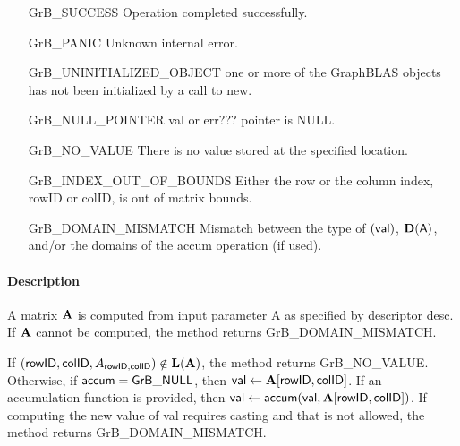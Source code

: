 \begin{itemize}[leftmargin=2.1in]
\item[{\sf GrB\_SUCCESS}]             Operation completed successfully.
\item[{\sf GrB\_PANIC}]               Unknown internal error.
\item[{\sf GrB\_UNINITIALIZED\_OBJECT}]   one or more of the GraphBLAS objects has
                             not been initialized by a call to {\sf new}.
\item[{\sf GrB\_NULL\_POINTER}]    {\sf val} or {\sf err???} pointer is {\sf NULL}.
\item[{\sf GrB\_NO\_VALUE}]             There is no value stored at the specified location.
\item[{\sf GrB\_INDEX\_OUT\_OF\_BOUNDS}]  Either the row or the column index,
                                      {\sf rowID} or {\sf colID}, is out of matrix bounds.
\item[{\sf GrB\_DOMAIN\_MISMATCH}]    Mismatch between the type of $(\sf val)$, 
                                      $\bold{D}({\sf A})$, and/or the domains of the 
                                      {\sf accum} operation (if used).
\end{itemize}

\paragraph{Description}

A matrix ${\bf A}$ is computed from input parameter {\sf A} as specified by descriptor {\sf desc}.
If ${\bf A}$ cannot be computed, the method returns {\sf GrB\_DOMAIN\_MISMATCH}.

If $({\sf rowID},{\sf colID}, A_{{\sf rowID},{\sf colID}}) \notin \bold{L}({\bf A})$, 
the method returns {\sf GrB\_NO\_VALUE}.  Otherwise, if 
${\sf accum} = {\sf GrB\_NULL}$, then ${\sf val} \leftarrow {\bf A}[{\sf rowID},{\sf colID}]$.
If an accumulation function is provided, then 
${\sf val} \leftarrow {\sf accum}({\sf val},{\bf A}[{\sf rowID},{\sf colID}])$.
If computing the new value of {\sf val} requires casting and that is not allowed,
the method returns {\sf GrB\_DOMAIN\_MISMATCH}.
